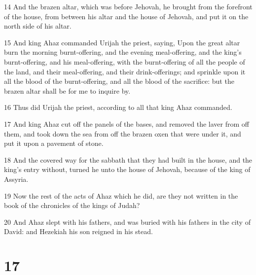 \par 14 And the brazen altar, which was before Jehovah, he brought from the forefront of the house, from between his altar and the house of Jehovah, and put it on the north side of his altar.
\par 15 And king Ahaz commanded Urijah the priest, saying, Upon the great altar burn the morning burnt-offering, and the evening meal-offering, and the king's burnt-offering, and his meal-offering, with the burnt-offering of all the people of the land, and their meal-offering, and their drink-offerings; and sprinkle upon it all the blood of the burnt-offering, and all the blood of the sacrifice: but the brazen altar shall be for me to inquire by.
\par 16 Thus did Urijah the priest, according to all that king Ahaz commanded.
\par 17 And king Ahaz cut off the panels of the bases, and removed the laver from off them, and took down the sea from off the brazen oxen that were under it, and put it upon a pavement of stone.
\par 18 And the covered way for the sabbath that they had built in the house, and the king's entry without, turned he unto the house of Jehovah, because of the king of Assyria.
\par 19 Now the rest of the acts of Ahaz which he did, are they not written in the book of the chronicles of the kings of Judah?
\par 20 And Ahaz slept with his fathers, and was buried with his fathers in the city of David: and Hezekiah his son reigned in his stead.

\chapter{17}


